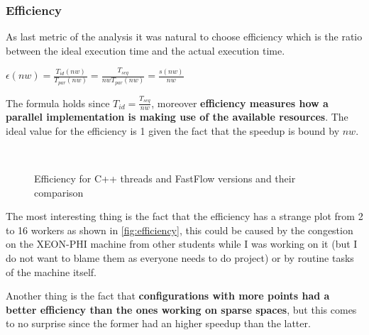 \subsubsection{Efficiency}
As last metric of the analysis it was natural to choose efficiency which is the ratio between the ideal execution time and the actual execution time.
\begin{center}
\begin{Large}
$\epsilon(nw)=\frac{T_{id}(nw)}{T_{par}(nw)}=\frac{T_{seq}}{nwT_{par}(nw)}=\frac{s(nw)}{nw}$
\end{Large}
\end{center}
The formula holds since $T_{id}=\frac{T_{seq}}{nw}$, moreover \textbf{efficiency measures how a parallel implementation is making use of the available resources}. The ideal value for the efficiency is 1 given the fact that the speedup is bound by $nw$.
\begin{figure}[H]
    \centering
    \\
    \caption{Efficiency for C++ threads and FastFlow versions and their comparison}
    \label{fig:efficiency}
\end{figure}
The most interesting thing is the fact that the efficiency has a strange plot from 2 to 16 workers as shown in \autoref{fig:efficiency}, this could be caused by the congestion on the XEON-PHI machine from other students while I was working on it (but I do not want to blame them as everyone needs to do project) or by routine tasks of the machine itself.
\vspace{3mm}

Another thing is the fact that \textbf{configurations with more points had a better efficiency than the ones working on sparse spaces}, but this comes to no surprise since the former had an higher speedup than the latter.